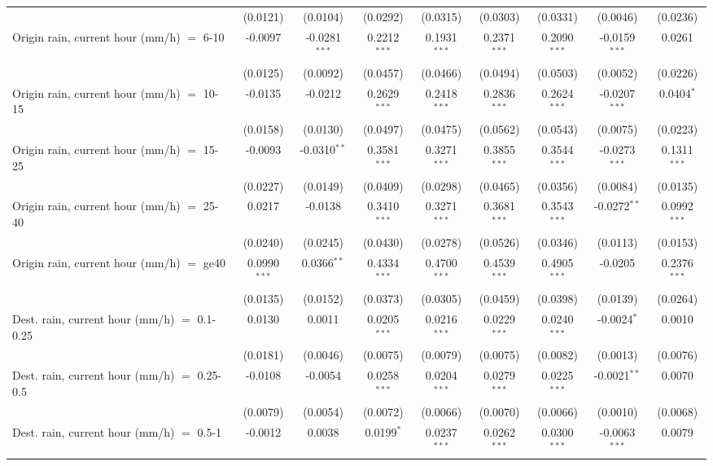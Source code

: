 \begin{tabular}{lcccccccc}
    & (0.0121) & (0.0104) & (0.0292) & (0.0315) & (0.0303) & (0.0331) & (0.0046) & (0.0236)\\
   Origin rain, current hour (mm/h) $=$ 6-10 & -0.0097 & -0.0281$^{***}$ & 0.2212$^{***}$ & 0.1931$^{***}$ & 0.2371$^{***}$ & 0.2090$^{***}$ & -0.0159$^{***}$ & 0.0261\\
    & (0.0125) & (0.0092) & (0.0457) & (0.0466) & (0.0494) & (0.0503) & (0.0052) & (0.0226)\\
   Origin rain, current hour (mm/h) $=$ 10-15 & -0.0135 & -0.0212 & 0.2629$^{***}$ & 0.2418$^{***}$ & 0.2836$^{***}$ & 0.2624$^{***}$ & -0.0207$^{***}$ & 0.0404$^{*}$\\
    & (0.0158) & (0.0130) & (0.0497) & (0.0475) & (0.0562) & (0.0543) & (0.0075) & (0.0223)\\
   Origin rain, current hour (mm/h) $=$ 15-25 & -0.0093 & -0.0310$^{**}$ & 0.3581$^{***}$ & 0.3271$^{***}$ & 0.3855$^{***}$ & 0.3544$^{***}$ & -0.0273$^{***}$ & 0.1311$^{***}$\\
    & (0.0227) & (0.0149) & (0.0409) & (0.0298) & (0.0465) & (0.0356) & (0.0084) & (0.0135)\\
   Origin rain, current hour (mm/h) $=$ 25-40 & 0.0217 & -0.0138 & 0.3410$^{***}$ & 0.3271$^{***}$ & 0.3681$^{***}$ & 0.3543$^{***}$ & -0.0272$^{**}$ & 0.0992$^{***}$\\
    & (0.0240) & (0.0245) & (0.0430) & (0.0278) & (0.0526) & (0.0346) & (0.0113) & (0.0153)\\
   Origin rain, current hour (mm/h) $=$ ge40 & 0.0990$^{***}$ & 0.0366$^{**}$ & 0.4334$^{***}$ & 0.4700$^{***}$ & 0.4539$^{***}$ & 0.4905$^{***}$ & -0.0205 & 0.2376$^{***}$\\
    & (0.0135) & (0.0152) & (0.0373) & (0.0305) & (0.0459) & (0.0398) & (0.0139) & (0.0264)\\
   Dest. rain, current hour (mm/h) $=$ 0.1-0.25 & 0.0130 & 0.0011 & 0.0205$^{***}$ & 0.0216$^{***}$ & 0.0229$^{***}$ & 0.0240$^{***}$ & -0.0024$^{*}$ & 0.0010\\
    & (0.0181) & (0.0046) & (0.0075) & (0.0079) & (0.0075) & (0.0082) & (0.0013) & (0.0076)\\
   Dest. rain, current hour (mm/h) $=$ 0.25-0.5 & -0.0108 & -0.0054 & 0.0258$^{***}$ & 0.0204$^{***}$ & 0.0279$^{***}$ & 0.0225$^{***}$ & -0.0021$^{**}$ & 0.0070\\
    & (0.0079) & (0.0054) & (0.0072) & (0.0066) & (0.0070) & (0.0066) & (0.0010) & (0.0068)\\
   Dest. rain, current hour (mm/h) $=$ 0.5-1 & -0.0012 & 0.0038 & 0.0199$^{*}$ & 0.0237$^{***}$ & 0.0262$^{***}$ & 0.0300$^{***}$ & -0.0063$^{***}$ & 0.0079\\

\end{tabular}
